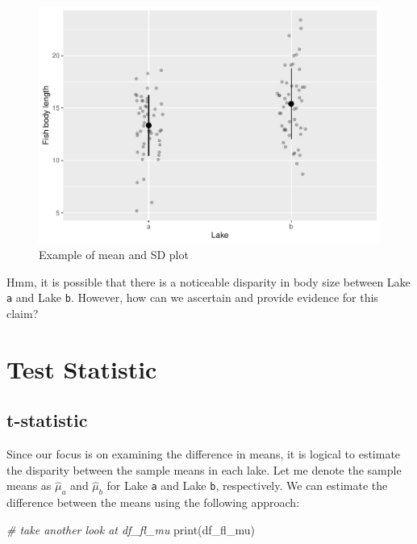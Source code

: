 \documentclass[
]{book}
\newenvironment{Shaded}{\begin{snugshade}}{\end{snugshade}}
\newcommand{\CommentTok}[1]{\textcolor[rgb]{0.56,0.35,0.01}{\textit{#1}}}
\newcommand{\FunctionTok}[1]{\textcolor[rgb]{0.00,0.00,0.00}{#1}}
\newcommand{\NormalTok}[1]{#1}
\begin{document}
\begin{figure}

{\centering \includegraphics{biostats_files/figure-latex/mean-plot-1} 

}

\caption{Example of mean and SD plot}\label{fig:mean-plot}
\end{figure}

Hmm, it is possible that there is a noticeable disparity in body size between Lake \texttt{a} and Lake \texttt{b}. However, how can we ascertain and provide evidence for this claim?

\hypertarget{test-statistic}{%
\section{Test Statistic}\label{test-statistic}}

\hypertarget{t-statistic}{%
\subsection{t-statistic}\label{t-statistic}}

Since our focus is on examining the difference in means, it is logical to estimate the disparity between the sample means in each lake. Let me denote the sample means as \(\hat{\mu}_a\) and \(\hat{\mu}_b\) for Lake \texttt{a} and Lake \texttt{b}, respectively. We can estimate the difference between the means using the following approach:

\begin{Shaded}
\begin{Highlighting}[]
\CommentTok{\# take another look at df\_fl\_mu}
\FunctionTok{print}\NormalTok{(df\_fl\_mu)}
\end{Highlighting}
\end{Shaded}
\end{document}
